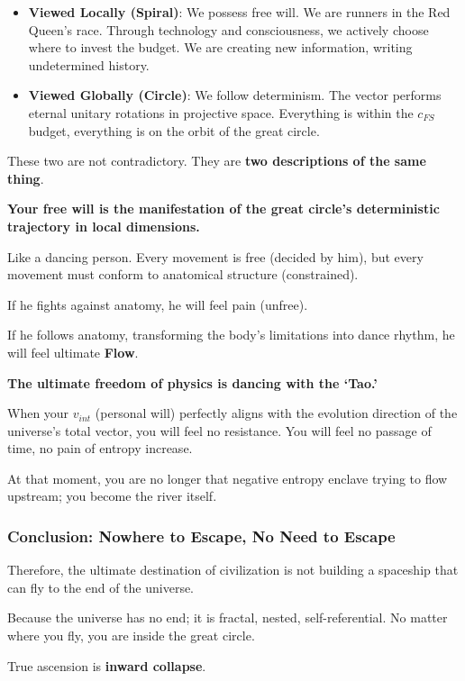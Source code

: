 \begin{itemize}
\item \textbf{Viewed Locally (Spiral)}: We possess free will. We are runners in the Red Queen's race. Through technology and consciousness, we actively choose where to invest the budget. We are creating new information, writing undetermined history.

\item \textbf{Viewed Globally (Circle)}: We follow determinism. The vector performs eternal unitary rotations in projective space. Everything is within the $c_{FS}$ budget, everything is on the orbit of the great circle.
\end{itemize}

These two are not contradictory. They are \textbf{two descriptions of the same thing}.

\textbf{Your free will is the manifestation of the great circle's deterministic trajectory in local dimensions.}

Like a dancing person. Every movement is free (decided by him), but every movement must conform to anatomical structure (constrained).

If he fights against anatomy, he will feel pain (unfree).

If he follows anatomy, transforming the body's limitations into dance rhythm, he will feel ultimate \textbf{Flow}.

\textbf{The ultimate freedom of physics is dancing with the `Tao.'}

When your $v_{int}$ (personal will) perfectly aligns with the evolution direction of the universe's total vector, you will feel no resistance. You will feel no passage of time, no pain of entropy increase.

At that moment, you are no longer that negative entropy enclave trying to flow upstream; you become the river itself.

\subsubsection{Conclusion: Nowhere to Escape, No Need to Escape}

Therefore, the ultimate destination of civilization is not building a spaceship that can fly to the end of the universe.

Because the universe has no end; it is fractal, nested, self-referential. No matter where you fly, you are inside the great circle.

True ascension is \textbf{inward collapse}.


